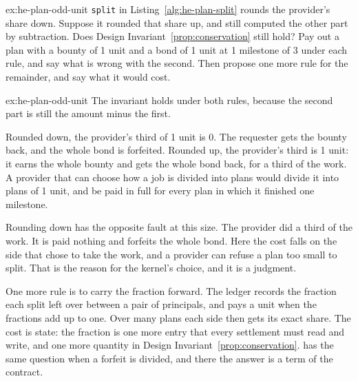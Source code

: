 \documentclass[11pt,a4paper]{article}
\theoremstyle{definition}
\theoremstyle{definition}
\theoremstyle{remark}
\begin{document}
\begin{pdexercise}[kind=Open,rating=2]{ex:he-plan-odd-unit}
\texttt{split} in Listing~\ref{alg:he-plan-split} rounds the provider's share down. Suppose it rounded that share up, and still computed the other part by subtraction. Does Design Invariant~\ref{prop:conservation} still hold? Pay out a plan with a bounty of 1 unit and a bond of 1 unit at 1 milestone of 3 under each rule, and say what is wrong with the second. Then propose one more rule for the remainder, and say what it would cost.
\end{pdexercise}
\begin{pdsolution}{ex:he-plan-odd-unit}
The invariant holds under both rules, because the second part is still the amount minus the first.

Rounded down, the provider's third of 1 unit is 0. The requester gets the bounty back, and the whole bond is forfeited. Rounded up, the provider's third is 1 unit: it earns the whole bounty and gets the whole bond back, for a third of the work. A provider that can choose how a job is divided into plans would divide it into plans of 1 unit, and be paid in full for every plan in which it finished one milestone.

Rounding down has the opposite fault at this size. The provider did a third of the work. It is paid nothing and forfeits the whole bond. Here the cost falls on the side that chose to take the work, and a provider can refuse a plan too small to split. That is the reason for the kernel's choice, and it is a judgment.

One more rule is to carry the fraction forward. The ledger records the fraction each split left over between a pair of principals, and pays a unit when the fractions add up to one. Over many plans each side then gets its exact share. The cost is state: the fraction is one more entry that every settlement must read and write, and one more quantity in Design Invariant~\ref{prop:conservation}.  has the same question when a forfeit is divided, and there the answer is a term of the contract.
\end{pdsolution}
\end{document}
